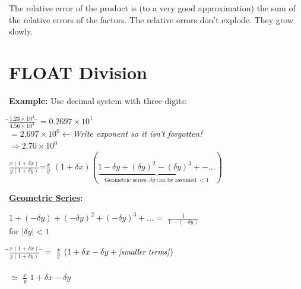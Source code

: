 \documentclass[a4paper,12pt,]{report}
\begin{document}
	The relative error of the product is (to a very good approximation) the sum of the relative errors of 
	the factors. The relative errors don't explode.  They grow slowly.

\section{FLOAT Division}

	\noindent \textbf{Example:} Use decimal system with three digits:

\begin{tabbing}
	\hspace*{4cm}\=\Large{$\frac{1.23 \times 10^4}{4.56 \times 10^3}$}
	\hspace*{0.1cm}\=\normalsize{$=0.2697\times 10^1$}\\
	\>\>$=2.697\times 10^0 \!\leftarrow$\footnotesize{\textit{Write exponent so it isn't forgotten!}}\\
	\> \> $\Rightarrow 2.70 \times 10^0$\\
	\> \Large{$\frac{x(1+\delta x)}{y(1+\delta y)}$}\>=\Large{$\frac{x}{y}$}
		\normalsize{$(1+\delta x)
		(\underbrace{1-\delta y+(\delta y)^2-(\delta y)^3+-...}_{\text{Geometric series.}\;\delta y\;
		\text{can be assumed}\;<1})$}
\end{tabbing}

\begin{center}
\fbox
{
	\parbox{0.6\textwidth}
	{
			\textbf{\underline{Geometric Series}:}
			\begin{center}
				$1+ (-\delta y) + (-\delta y)^2 + (-\delta y)^3 + ...
				=$ \large{$\frac{1}{1-(-\delta y)}$}\\
				\medskip
				for $\left| \delta y \right| <1$
			\end{center}
	}
}
\end{center}

\begin{tabbing}
	\hspace*{4.1cm}\=\Large{$\frac{x(1+\delta x)}{y(1+\delta y)}$}
	\hspace*{0.1cm} \= \normalsize{$=$} \Large{$\frac{x}{y}$}
		\normalsize{$(1 + \delta x - \delta y + \text{\small{\textit{[smaller terms]}}})$}\\
	\medskip \\
	 \>\> \normalsize{$\simeq$} \Large{$\frac{x}{y}$} \normalsize{$1+ \delta x - \delta y$}
\end{tabbing}
\end{document}
